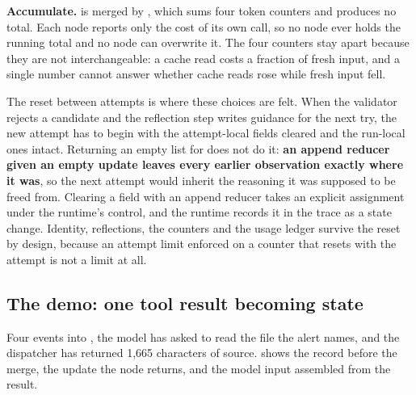 \item \textbf{Accumulate.}  is merged by , which sums four token
counters and produces no total. Each node reports only the cost of its own call, so no node ever
holds the running total and no node can overwrite it. The four counters stay apart because they
are not interchangeable: a cache read costs a fraction of fresh input, and a single number cannot
answer whether cache reads rose while fresh input fell.

\ei

The reset between attempts is where these choices are felt. When the validator rejects a candidate
and the reflection step writes guidance for the next try, the new attempt has to begin with the
attempt-local fields cleared and the run-local ones intact. Returning an empty list for
 does not do it: \textbf{an append reducer given an empty update leaves every
earlier observation exactly where it was}, so the next attempt would inherit the reasoning it was
supposed to be freed from. Clearing a field with an append reducer takes an explicit assignment
under the runtime's control, and the runtime records it in the trace as a state change. Identity,
reflections, the counters and the usage ledger survive the reset by design, because an attempt
limit enforced on a counter that resets with the attempt is not a limit at all.

\subsection{The demo: one tool result becoming state}
\label{sec:state-demo}

Four events into , the model has asked to read the file the alert
names, and the dispatcher has returned 1,665 characters of source.  shows
the record before the merge, the update the  node returns, and the model input
assembled from the result.

